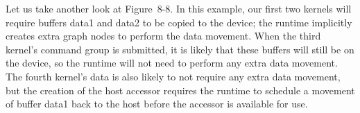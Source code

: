 Let us take another look at Figure 8-8. In this example, our first two kernels will require buffers data1 and data2 to be copied to the device; the runtime implicitly creates extra graph nodes to perform the data movement. When the third kernel’s command group is submitted, it is likely that these buffers will still be on the device, so the runtime will not need to perform any extra data movement. The fourth kernel’s data is also likely to not require any extra data movement, but the creation of the host accessor requires the runtime to schedule a movement of buffer data1 back to the host before the accessor is available for use.\par



























































